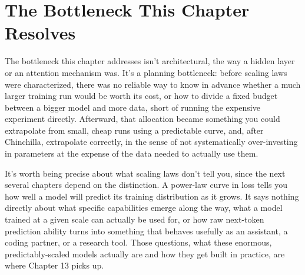\section*{The Bottleneck This Chapter Resolves}

The bottleneck this chapter addresses isn't architectural, the way a hidden layer or an attention mechanism was. It's a planning bottleneck: before scaling laws were characterized, there was no reliable way to know in advance whether a much larger training run would be worth its cost, or how to divide a fixed budget between a bigger model and more data, short of running the expensive experiment directly. Afterward, that allocation became something you could extrapolate from small, cheap runs using a predictable curve, and, after Chinchilla, extrapolate correctly, in the sense of not systematically over-investing in parameters at the expense of the data needed to actually use them.

It's worth being precise about what scaling laws don't tell you, since the next several chapters depend on the distinction. A power-law curve in loss tells you how well a model will predict its training distribution as it grows. It says nothing directly about what specific capabilities emerge along the way, what a model trained at a given scale can actually be used for, or how raw next-token prediction ability turns into something that behaves usefully as an assistant, a coding partner, or a research tool. Those questions, what these enormous, predictably-scaled models actually are and how they get built in practice, are where Chapter 13 picks up.
